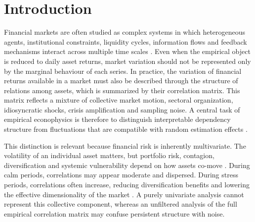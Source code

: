 \section{Introduction}
\label{sec:introduction}

Financial markets are often studied as complex systems in which heterogeneous agents, institutional constraints, liquidity cycles, information flows and feedback mechanisms interact across multiple time scales \cite{mantegna_stanley_1999_book,cont_2001_empirical}. Even when the empirical object is reduced to daily asset returns, market variation should not be represented only by the marginal behaviour of each series. In practice, the variation of financial returns available in a market must also be described through the structure of relations among assets, which is summarized by their correlation matrix. This matrix reflects a mixture of collective market motion, sectoral organization, idiosyncratic shocks, crisis amplification and sampling noise. A central task of empirical econophysics is therefore to distinguish interpretable dependency structure from fluctuations that are compatible with random estimation effects \cite{raddant_dimatteo_2023}.

This distinction is relevant because financial risk is inherently multivariate. The volatility of an individual asset matters, but portfolio risk, contagion, diversification and systemic vulnerability depend on how assets co-move \cite{billio_2012_econometric}. During calm periods, correlations may appear moderate and dispersed. During stress periods, correlations often increase, reducing diversification benefits and lowering the effective dimensionality of the market \cite{junior_2012_correlation,zheng_2012_changes}. A purely univariate analysis cannot represent this collective component, whereas an unfiltered analysis of the full empirical correlation matrix may confuse persistent structure with noise.

